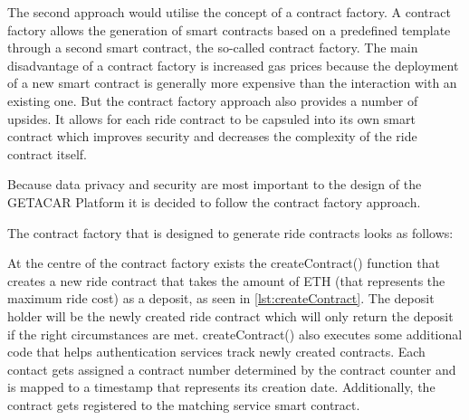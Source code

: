 The second approach would utilise the concept of a contract factory. A contract factory allows the generation of smart contracts based on a predefined template through a second smart contract, the so-called contract factory. The main disadvantage of a contract factory is increased gas prices because the deployment of a new smart contract is generally more expensive than the interaction with an existing one. But the contract factory approach also provides a number of upsides. It allows for each ride contract to be capsuled into its own smart contract which improves security and decreases the complexity of the ride contract itself. 

Because data privacy and security are most important to the design of the GETACAR Platform it is decided to follow the contract factory approach.

The contract factory that is designed to generate ride contracts looks as follows:

At the centre of the contract factory exists the createContract() function that creates a new ride contract that takes the amount of ETH (that represents the maximum ride cost) as a deposit, as seen in \ref{lst:createContract}. The deposit holder will be the newly created ride contract which will only return the deposit if the right circumstances are met. createContract() also executes some additional code that helps authentication services track newly created contracts. Each contact gets assigned a contract number determined by the contract counter and is mapped to a timestamp that represents its creation date. Additionally, the contract gets registered to the matching service smart contract.



